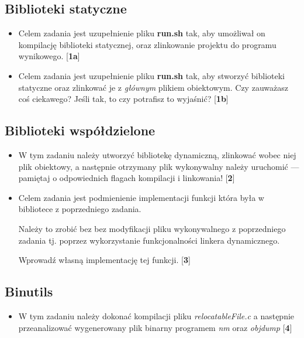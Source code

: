 \documentclass[12pt]{article}
\begin{document}
\subsection{Biblioteki statyczne}
\begin{itemize}
\item Celem zadania jest uzupełnienie pliku \textbf{run.sh} tak, aby umożliwał
  on kompilację biblioteki statycznej, oraz zlinkowanie projektu do programu
  wynikowego. [\textbf{1a}]
\item Celem zadania jest uzupełnienie pliku \textbf{run.sh} tak, aby stworzyć
  biblioteki statyczne oraz zlinkować je z \textit{głównym} plikiem obiektowym.
  Czy zauważasz coś ciekawego? Jeśli tak, to czy potrafisz to wyjaśnić?
  [\textbf{1b}]
\end{itemize}
\subsection{Biblioteki współdzielone}
\begin{itemize}
\item W tym zadaniu należy utworzyć bibliotekę dynamiczną, zlinkować wobec niej
  plik obiektowy, a następnie otrzymany plik wykonywalny należy uruchomić ---
  pamiętaj o odpowiednich flagach kompilacji i linkowania! [\textbf{2}]
\item Celem zadania jest podmienienie implementacji funkcji która była w
  bibliotece z poprzedniego zadania.

  Należy to zrobić bez bez modyfikacji pliku wykonywalnego z poprzedniego
  zadania tj. poprzez wykorzystanie funkcjonalności linkera dynamicznego.

  Wprowadź własną implementację tej funkcji. [\textbf{3}]
\end{itemize}
\subsection{Binutils}
\begin{itemize}
\item W tym zadaniu należy dokonać kompilacji pliku \textit{relocatableFile.c} a
  następnie przeanalizować wygenerowany plik binarny programem \textit{nm} oraz
  \textit{objdump} [\textbf{4}]
\end{itemize}
\end{document}
